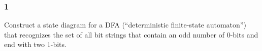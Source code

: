 \documentclass[../main.tex]{subfiles}
\begin{document}
\subsubsection*{1\hfill}
Construct a state diagram for a DFA (``deterministic finite-state automaton'') that recognizes the set of all bit strings that contain an odd number of $0$-bits and end with two $1$-bits.

\solution
\end{document}

